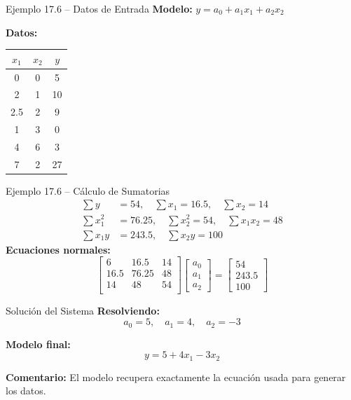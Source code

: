 \documentclass[main.tex]{subfiles}
\begin{document}
\begin{frame}{Ejemplo 17.6 – Datos de Entrada}
  \small
  \textbf{Modelo:} \( y = a_0 + a_1 x_1 + a_2 x_2 \)

  \textbf{Datos:}
  \begin{tabular}{ccc}
    \hline
    \(x_1\) & \(x_2\) & \(y\) \\
    \hline
    0 & 0 & 5 \\
    2 & 1 & 10 \\
    2.5 & 2 & 9 \\
    1 & 3 & 0 \\
    4 & 6 & 3 \\
    7 & 2 & 27 \\
    \hline
  \end{tabular}
\end{frame}

\begin{frame}{Ejemplo 17.6 – Cálculo de Sumatorias}
  \small
  \[
    \begin{aligned}
      \sum y &= 54,\quad \sum x_1 = 16.5,\quad \sum x_2 = 14 \\
      \sum x_1^2 &= 76.25,\quad \sum x_2^2 = 54,\quad \sum x_1 x_2 = 48 \\
      \sum x_1 y &= 243.5,\quad \sum x_2 y = 100
    \end{aligned}
  \]
  \textbf{Ecuaciones normales:}
  \[
    \begin{bmatrix}
      6 & 16.5 & 14 \\
      16.5 & 76.25 & 48 \\
      14 & 48 & 54 \\
    \end{bmatrix}
    \begin{bmatrix}
      a_0 \\ a_1 \\ a_2
    \end{bmatrix}
    =
    \begin{bmatrix}
      54 \\ 243.5 \\ 100
    \end{bmatrix}
  \]
\end{frame}

\begin{frame}{Solución del Sistema}
  \textbf{Resolviendo:}
  \[
    a_0 = 5,\quad a_1 = 4,\quad a_2 = -3
  \]

  \textbf{Modelo final:}
  \[
    y = 5 + 4x_1 - 3x_2
  \]

  \textbf{Comentario:} El modelo recupera exactamente la ecuación usada para generar los datos.
\end{frame}
\end{document}
